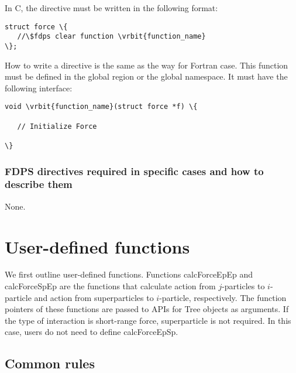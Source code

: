 \begin{enumerate}[leftmargin=*,label=(\arabic*)]
In C, the directive must be written in the following format:
\begin{screen}
\begin{Verbatim}[commandchars=\\\{\}]
struct force \{
   //\$fdps clear function \vrbit{function_name}
\};
\end{Verbatim}
\end{screen}
How to write a directive is the same as the way for Fortran case. This function must be defined in the global region or the global namespace. It must have the following interface:
\begin{screen}
\begin{Verbatim}[commandchars=\\\{\}]
void \vrbit{function_name}(struct force *f) \{
   
   // Initialize Force
   
\}
\end{Verbatim}
\end{screen}

\end{enumerate}

\subsubsection{FDPS directives required in specific cases and how to describe them}
None.


\section{User-defined functions}
\label{sec:user_defined_function}
We first outline user-defined functions. Functions calcForceEpEp and calcForceSpEp are the functions that calculate action from $j$-particles to $i$-particle and action from superparticles to $i$-particle, respectively. The function pointers of these functions are passed to APIs for Tree objects as arguments. If the type of interaction is short-range force, superparticle is not required. In this case, users do not need to define calcForceEpSp.

\subsection{Common rules}
